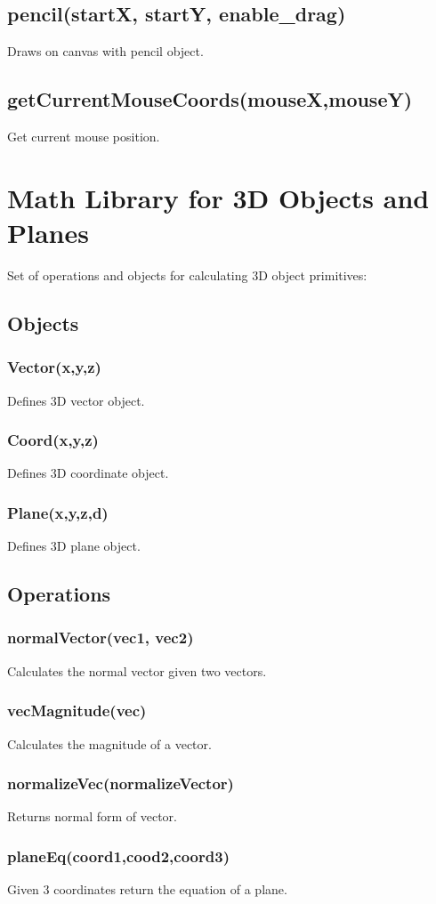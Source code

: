 \documentclass{report}
\begin{document}
\subsection{pencil(startX, startY, enable\_drag)}
Draws on canvas with pencil object.
\subsection{getCurrentMouseCoords(mouseX,mouseY)}
Get current mouse position.

\section{Math Library for 3D Objects and Planes}
Set of operations and objects for calculating 3D object primitives:
\subsection{Objects}
\subsubsection{Vector(x,y,z)}
Defines 3D vector object.
\subsubsection{Coord(x,y,z)}
Defines 3D coordinate object.
\subsubsection{Plane(x,y,z,d)}
Defines 3D plane object.
\subsection{Operations}
\subsubsection{normalVector(vec1, vec2)}
Calculates the normal vector given two vectors.
\subsubsection{vecMagnitude(vec)}
Calculates the magnitude of a vector.
\subsubsection{normalizeVec(normalizeVector)}
Returns normal form of vector.
\subsubsection{planeEq(coord1,cood2,coord3)}
Given 3 coordinates return the equation of a plane.
\end{document}
